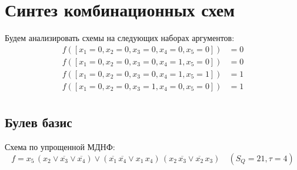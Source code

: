 \documentclass{article}
\begin{document}
\section*{Синтез комбинационных схем}
Будем анализировать схемы на следующих наборах аргументов:
\begin{align*}
    f([x_1 = 0, x_2 = 0, x_3 = 0, x_4 = 0, x_5 = 0]) &= 0 \\
    f([x_1 = 0, x_2 = 0, x_3 = 0, x_4 = 1, x_5 = 0]) &= 0 \\
    f([x_1 = 0, x_2 = 0, x_3 = 0, x_4 = 1, x_5 = 1]) &= 1 \\
    f([x_1 = 0, x_2 = 0, x_3 = 1, x_4 = 0, x_5 = 0]) &= 1 \\
\end{align*}
\subsection*{Булев базис}
Схема по упрощенной МДНФ:
\[f = x_{5} \, \left(x_{2} \lor \overline{x_{3}} \lor \overline{x_{4}}\right) \lor \left(\overline{x_{1}} \, \overline{x_{4}} \lor x_{1} \, x_{4}\right) \, \left(x_{2} \, \overline{x_{3}} \lor \overline{x_{2}} \, x_{3}\right)\quad(S_Q = 21, \tau = 4)\]
\end{document}
